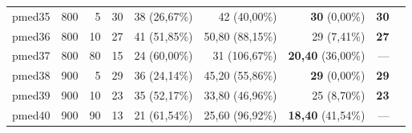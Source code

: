 \documentclass[12pt]{article}
\begin{document}
\begin{table}[ht]
{\begin{tabular}{lrrrrrrrr}
pmed35 & 800 & 5   & 30  & 38 (26,67\%)  & 42 (40,00\%)     & \textbf{30} (0,00\%)     & \textbf{30} \\
pmed36 & 800 & 10  & 27  & 41 (51,85\%)  & 50,80 (88,15\%)  & 29 (7,41\%)              & \textbf{27} \\
pmed37 & 800 & 80  & 15  & 24 (60,00\%)  & 31 (106,67\%)    & \textbf{20,40} (36,00\%) & --- \\
pmed38 & 900 & 5   & 29  & 36 (24,14\%)  & 45,20 (55,86\%)  & \textbf{29} (0,00\%)     & \textbf{29} \\
pmed39 & 900 & 10  & 23  & 35 (52,17\%)  & 33,80 (46,96\%)  & 25 (8,70\%)              & \textbf{23} \\
pmed40 & 900 & 90  & 13  & 21 (61,54\%)  & 25,60 (96,92\%)  & \textbf{18,40} (41,54\%) & --- \\
\hline
\end{tabular}
}
\end{table}
\end{document}
